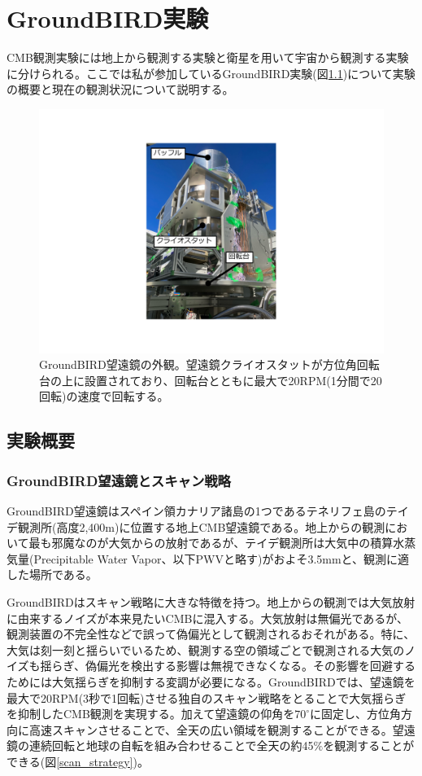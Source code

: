 \chapter{GroundBIRD実験}

CMB観測実験には地上から観測する実験と衛星を用いて宇宙から観測する実験に分けられる。ここでは私が参加しているGroundBIRD実験(図\ref{GB_overview})について実験の概要と現在の観測状況について説明する。

\begin{figure}[htbp]
  \centering
  \includegraphics[width=0.5\columnwidth]{3_GB/figs/GB_overview2.pdf}
  \caption{GroundBIRD望遠鏡の外観。望遠鏡クライオスタットが方位角回転台の上に設置されており、回転台とともに最大で20RPM(1分間で20回転)の速度で回転する。}
  \label{GB_overview}
\end{figure}
\section{実験概要}

\subsection{GroundBIRD望遠鏡とスキャン戦略}
GroundBIRD望遠鏡はスペイン領カナリア諸島の1つであるテネリフェ島のテイデ観測所(高度2,400m)に位置する地上CMB望遠鏡である。地上からの観測において最も邪魔なのが大気からの放射であるが、テイデ観測所は大気中の積算水蒸気量(Precipitable Water Vapor、以下PWVと略す)がおよそ3.5mm\cite{PWV}と、観測に適した場所である。

GroundBIRDはスキャン戦略に大きな特徴を持つ。地上からの観測では大気放射に由来するノイズが本来見たいCMBに混入する。大気放射は無偏光であるが、観測装置の不完全性などで誤って偽偏光として観測されるおそれがある。特に、大気は刻一刻と揺らいでいるため、観測する空の領域ごとで観測される大気のノイズも揺らぎ、偽偏光を検出する影響は無視できなくなる。その影響を回避するためには大気揺らぎを抑制する変調が必要になる。GroundBIRDでは、望遠鏡を最大で20RPM(3秒で1回転)させる独自のスキャン戦略をとることで大気揺らぎを抑制したCMB観測を実現する。加えて望遠鏡の仰角を$70^{\circ}$に固定し、方位角方向に高速スキャンさせることで、全天の広い領域を観測することができる。望遠鏡の連続回転と地球の自転を組み合わせることで全天の約45$\%$を観測することができる(図\ref{scan_strategy})。

